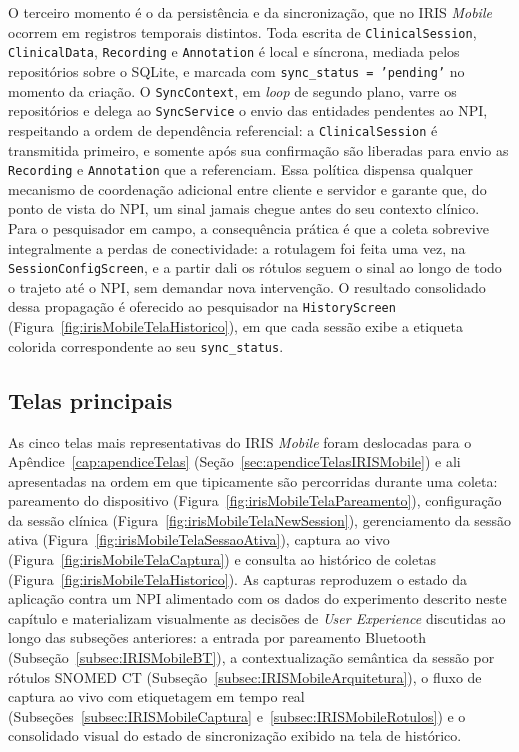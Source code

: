 O terceiro momento é o da persistência e da sincronização, que no IRIS \textit{Mobile} ocorrem em registros temporais distintos. Toda escrita de \texttt{ClinicalSession}, \texttt{ClinicalData}, \texttt{Recording} e \texttt{Annotation} é local e síncrona, mediada pelos repositórios sobre o SQLite, e marcada com \texttt{sync\_status = 'pending'} no momento da criação. O \texttt{SyncContext}, em \textit{loop} de segundo plano, varre os repositórios e delega ao \texttt{SyncService} o envio das entidades pendentes ao NPI, respeitando a ordem de dependência referencial: a \texttt{ClinicalSession} é transmitida primeiro, e somente após sua confirmação são liberadas para envio as \texttt{Recording} e \texttt{Annotation} que a referenciam. Essa política  dispensa qualquer mecanismo de coordenação adicional entre cliente e servidor e garante que, do ponto de vista do NPI, um sinal jamais chegue antes do seu contexto clínico. Para o pesquisador em campo, a consequência prática é que a coleta sobrevive integralmente a perdas de conectividade: a rotulagem foi feita uma vez, na \texttt{SessionConfigScreen}, e a partir dali os rótulos seguem o sinal ao longo de todo o trajeto até o NPI, sem demandar nova intervenção. O resultado consolidado dessa propagação é oferecido ao pesquisador na \texttt{HistoryScreen} (Figura~\ref{fig:irisMobileTelaHistorico}), em que cada sessão exibe a etiqueta colorida correspondente ao seu \texttt{sync\_status}.



\subsection{Telas principais}\label{subsec:IRISMobileTelas}

As cinco telas mais representativas do IRIS \textit{Mobile} foram deslocadas para o Apêndice~\ref{cap:apendiceTelas} (Seção~\ref{sec:apendiceTelasIRISMobile}) e ali apresentadas na ordem em que tipicamente são percorridas durante uma coleta: pareamento do dispositivo (Figura~\ref{fig:irisMobileTelaPareamento}), configuração da sessão clínica (Figura~\ref{fig:irisMobileTelaNewSession}), gerenciamento da sessão ativa (Figura~\ref{fig:irisMobileTelaSessaoAtiva}), captura ao vivo (Figura~\ref{fig:irisMobileTelaCaptura}) e consulta ao histórico de coletas (Figura~\ref{fig:irisMobileTelaHistorico}). As capturas reproduzem o estado da aplicação contra um NPI alimentado com os dados do experimento descrito neste capítulo e materializam visualmente as decisões de \textit{User Experience} discutidas ao longo das subseções anteriores: a entrada por pareamento Bluetooth (Subseção~\ref{subsec:IRISMobileBT}), a contextualização semântica da sessão por rótulos SNOMED CT (Subseção~\ref{subsec:IRISMobileArquitetura}), o fluxo de captura ao vivo com etiquetagem em tempo real (Subseções~\ref{subsec:IRISMobileCaptura} e~\ref{subsec:IRISMobileRotulos}) e o consolidado visual do estado de sincronização exibido na tela de histórico.

